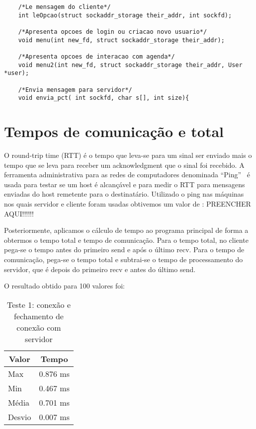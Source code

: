 \documentclass[10pt,a4paper]{article}
\begin{document}
\begin{itemize}
\begin{lstlisting}
    /*Le mensagem do cliente*/
    int leOpcao(struct sockaddr_storage their_addr, int sockfd);
   
    /*Apresenta opcoes de login ou criacao novo usuario*/
    void menu(int new_fd, struct sockaddr_storage their_addr);
  
    /*Apresenta opcoes de interacao com agenda*/
    void menu2(int new_fd, struct sockaddr_storage their_addr, User *user);

    /*Envia mensagem para servidor*/
    void envia_pct( int sockfd, char s[], int size){

  \end{lstlisting}


\end{itemize}


\section{Tempos de comunicação e total}
O round-trip time (RTT) é o tempo que leva-se para um sinal ser
enviado mais o tempo que se leva para receber um acknowledgment que o
sinal foi recebido. A ferramenta administrativa para as redes de
computadores denominada ``Ping''~\cite{Ping} é usada para testar se um host é alcançável e para
medir o RTT para mensagens enviadas do host remetente para o
destinatário.
Utilizado o ping nas máquinas nos quais servidor e cliente foram
usadas obtivemos um valor de : PREENCHER AQUI!!!!!!

Posteriormente, aplicamos o cálculo de tempo ao programa principal de
forma a obtermos o tempo total e tempo de comunicação.
Para o tempo total, no cliente pega-se o tempo antes do primeiro send e após o último recv.
Para o tempo de comunicação, pega-se o tempo total e subtrai-se o tempo de processamento do servidor,
que é depois do primeiro recv e antes do último send.

O resultado obtido para 100 valores foi:

\begin{table}[h!]
\caption{Teste 1: conexão e fechamento de conexão com servidor}
\begin{center}
  \begin{tabular}{lr}
    \multicolumn{1}{c}{Valor} & \multicolumn{1}{c}{Tempo}\\
    \hline
    Max & 0.876 ms\\
    Min & 0.467 ms\\
    Média & 0.701 ms \\
    Desvio & 0.007 ms
  \end{tabular}

\end{center}
\end{table}
\end{document}
